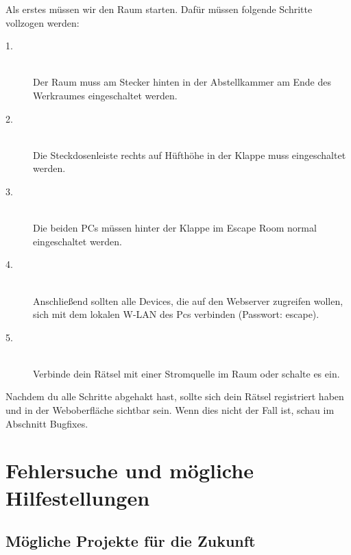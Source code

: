 \documentclass[12pt]{article} %
\begin{document}
Als erstes müssen wir den Raum starten. Dafür müssen folgende Schritte vollzogen werden:

\begin{description} %
	\item[1.] \hfill \\
	      Der Raum muss am Stecker hinten in der Abstellkammer am Ende des Werkraumes eingeschaltet werden.

	\item[2.] \hfill \\
	     Die Steckdosenleiste rechts auf Hüfthöhe in der Klappe muss eingeschaltet werden.

	\item[3.] \hfill \\
		Die beiden PCs müssen hinter der Klappe im Escape Room normal eingeschaltet werden.

	\item[4.] \hfill \\
	      Anschließend sollten alle Devices, die auf den Webserver zugreifen wollen, sich mit dem lokalen W-LAN des Pcs verbinden (Passwort: escape).

	\item[5.] \hfill \\
	      Verbinde dein Rätsel mit einer Stromquelle im Raum oder schalte es ein.
\end{description} %

Nachdem du alle Schritte abgehakt hast, sollte sich dein Rätsel registriert haben und in der Weboberfläche sichtbar sein. Wenn dies nicht der Fall ist, schau im Abschnitt {Bugfixes}.


\section{Fehlersuche und mögliche Hilfestellungen}



\subsection{Mögliche Projekte für die Zukunft} %
\end{document}
